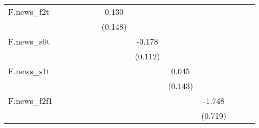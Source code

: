 {\begin{tabular}{l*{12}{c}}
\addlinespace
F.news\_f2t  &                     &                     &                     &                     &                     &       0.130         &                     &                     &                     &                     &                     &                     \\
            &                     &                     &                     &                     &                     &     (0.148)         &                     &                     &                     &                     &                     &                     \\
\addlinespace
F.news\_s0t  &                     &                     &                     &                     &                     &                     &      -0.178         &                     &                     &                     &                     &                     \\
            &                     &                     &                     &                     &                     &                     &     (0.112)         &                     &                     &                     &                     &                     \\
\addlinespace
F.news\_s1t  &                     &                     &                     &                     &                     &                     &                     &       0.045         &                     &                     &                     &                     \\
            &                     &                     &                     &                     &                     &                     &                     &     (0.143)         &                     &                     &                     &                     \\
\addlinespace
F.news\_f2f1 &                     &                     &                     &                     &                     &                     &                     &                     &      -1.748\sym{**} &                     &                     &                     \\
            &                     &                     &                     &                     &                     &                     &                     &                     &     (0.719)         &                     &                     &                     \\

\end{tabular}}
